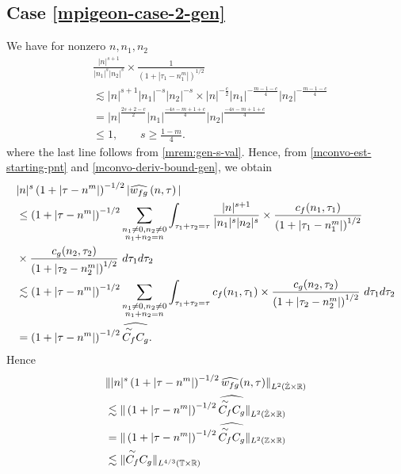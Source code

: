 \subsection{Case \texorpdfstring{\eqref{mpigeon-case-2-gen}}{2}}
We have for nonzero $ n, n_1, n_2 $
%
\begin{equation}
	\label{mconvo-deriv-bound-gen}
	\begin{split}
		& \frac{|n|^{s+1}}{|n_1|^s 
		| n_2|^s}
		\times
		\frac{1}{(1 + | \tau_1 -n_1^m |)^{1/2}}
		\\
		& \lesssim | n |^{s+1}| n_1 |^{-s}| n_2 |^{-s} \times | n
		|^{-\frac{c}{2}}| n_1 |^{-\frac{m-1-c}{4}}| n_2 |^{-\frac{m-1-c}{4}} 
		\\
		& = | n |^{\frac{2s+2 -c}{2}} | n_1 |^{\frac{-4s -m + 1+ c}{4}} | n_2
		|^\frac{-4s -m + 1+ c}{4}
		\\
		& \le 1, \qquad s \ge \frac{1-m}{4}.
	\end{split}  
\end{equation}
%
%
where the last line follows from \cref{mrem:gen-s-val}.
Hence, from \eqref{mconvo-est-starting-pnt} and \eqref{mconvo-deriv-bound-gen},
we obtain 
\begin{equation}
	\label{mconvo-est-starting-pnt-gen}
	\begin{split}
		 & |n|^s \left( 1 + | \tau - n^m | \right)^{-1/2} | \widehat{w_{fg}}\left( 
		n, \tau \right) |
		\\
		& \le \left( 1 + | \tau - n^m | \right)^{-1/2}
		\sum_{\substack{n_1 \neq0, n_2 \neq 0 \\n_1 + n_2 =n}} \int_{\tau_1 + \tau_2 = \tau}\frac{|n|^{s+1}}{|n_1|^s | n_2|^s} 
		\times \frac{c_f(n_1, \tau_1)}{\left( 1 + | \tau_1 - n_1^m | 
		\right)^{1/2}}
		\\
		& \times
		\frac{c_g(n_2, \tau_2)}{\left( 1 + | \tau_2 - n_2^m | 
		\right)^{1/2}}\ d \tau_1 d \tau_2
		\\
		& \lesssim \left( 1 + | \tau - n^m | \right)^{-1/2}
		\sum_{\substack{n_1 \neq0, n_2 \neq 0 \\n_1 + n_2 =n}} \int_{\tau_1 + \tau_2
		= \tau} c_f(n_1, \tau_1) \times
		\frac{c_g(n_2, \tau_2)}{\left( 1 + | \tau_2 - n_2^m | 
		\right)^{1/2}}\ d \tau_1 d \tau_2
		\\
		& = \left( 1 + | \tau - n^m | \right)^{-1/2}
\widehat{\overset{\sim}{C_f} C_g}.
	\end{split}
\end{equation}
%
%
%
Hence
%
\begin{equation}
	\label{m3f-gen}
	\begin{split}
		& \| |n|^s \left( 1 + | \tau - n^m | \right)^{-1/2} \widehat{w_{fg}}(n, \tau) 
		\|_{L^2(\dot{\mathbb{Z}} \times \mathbb{R})}
		\\
		& \lesssim \|\left( 1 + | \tau - n^m | \right)^{-1/2} 
		\widehat{\overset{\sim}{C_f} C_g } \|_{L^2(\dot{\mathbb{Z}} \times \mathbb{R})}
		\\
		& =  \|\left( 1 + | \tau - n^m | \right)^{-1/2} 
		\widehat{\overset{\sim}{C_f} C_g } \|_{L^2(\mathbb{Z} \times \mathbb{R})}
		\\
		& \lesssim  \|\overset{\sim}{C_f} C_g  \|_{L^{4/3}(\mathbb{T} \times \mathbb{R})}
	\end{split}
\end{equation}
